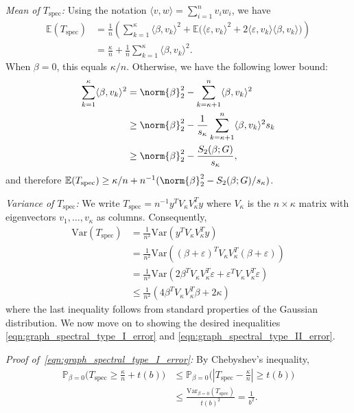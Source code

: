 \documentclass{article}
\newcommand{\abs}[1]{\left \lvert #1 \right \rvert}
\newcommand{\Var}{\mathrm{Var}}
\newcommand{\1}{\mathbf{1}}
\newcommand{\Pbb}{\mathbb{P}}
\newcommand{\Ebb}{\mathbb{E}}
\newcommand{\dotp}[2]{\langle #1, #2 \rangle}
\newcommand{\spec}{\mathrm{spec}}
\theoremstyle{alden}
\theoremstyle{aldenthm}
\theoremstyle{definition}
\theoremstyle{remark}
\begin{document}
\textit{Mean of $T_{\mathrm{spec}}$:} Using the notation $\dotp{v}{w} = \sum_{i = 1}^{n} v_iw_i$, we have
\begin{align*}
\Ebb(T_{\spec}) & = \frac{1}{n}\left(\sum_{k = 1}^{\kappa} \dotp{\beta}{v_k}^2 + \Ebb\bigl( \dotp{\varepsilon}{v_k}^2 + 2 \dotp{\varepsilon}{v_k} \dotp{\beta}{v_k}\bigr)\right) \\
& = \frac{\kappa}{n} + \frac{1}{n}\sum_{k = 1}^{\kappa}\dotp{\beta}{v_k}^2.
\end{align*}
When $\beta = 0$, this equals $\kappa/n$. Otherwise, we have the following lower bound:
\begin{align*}
\sum_{k = 1}^{\kappa}\dotp{\beta}{v_k}^2 & = \norm{\beta}_2^2 - \sum_{k = \kappa + 1}^{n} \dotp{\beta}{v_k}^2 \\
& \geq \norm{\beta}_2^2 - \frac{1}{s_{\kappa}}\sum_{k = \kappa + 1}^{n} \dotp{\beta}{v_k}^2 s_k \\
& \geq \norm{\beta}_2^2 - \frac{S_2(\beta;G)}{s_{\kappa}},
\end{align*}
and therefore $\Ebb(T_{\spec}) \geq \kappa/n + n^{-1}(\norm{\beta}_2^2 - S_2(\beta;G)/s_{\kappa})$. 

\vspace{.2 in}

\textit{Variance of $T_{\mathrm{spec}}$:}
We write $T_{\mathrm{spec}} = n^{-1} y^T V_{\kappa} V_{\kappa}^T y$ where $V_{\kappa}$ is the $n \times \kappa$ matrix with eigenvectors $v_1,\ldots,v_{\kappa}$ as columns. Consequently,
\begin{align}
\Var(T_{\spec}) & = \frac{1}{n^2} \Var(y^T V_{\kappa} V_{\kappa}^T y) \\
& = \frac{1}{n^2} \Var((\beta + \varepsilon)^T V_{\kappa} V_{\kappa}^T (\beta + \varepsilon)) \\
& = \frac{1}{n^2} \Var(2 \beta^T V_{\kappa} V_{\kappa}^T \varepsilon + \varepsilon^T V_{\kappa} V_{\kappa}^T \varepsilon) \\
& \leq \frac{1}{n^2}(4 \beta^T V_{\kappa} V_{\kappa}^T \beta + 2\kappa)
\end{align}
where the last inequality follows from standard properties of the Gaussian distribution. We now move on to showing the desired inequalities \eqref{eqn:graph_spectral_type_I_error} and \eqref{eqn:graph_spectral_type_II_error}.

\vspace{.2 in}

\textit{Proof of~\eqref{eqn:graph_spectral_type_I_error}:} By Chebyshev's inequality,
\begin{align*}
\Pbb_{\beta = 0}\bigl(T_{\spec} \geq \frac{\kappa}{n} + t(b)\bigr)
& \leq \Pbb_{\beta = 0}\bigl(\abs{T_{\spec} - \frac{\kappa}{n}} \geq t(b)\bigr) \\
& \leq \frac{\Var_{\beta = 0}(T_{\spec})}{t(b)^2} = \frac{1}{b^2}.
\end{align*}
\end{document}

